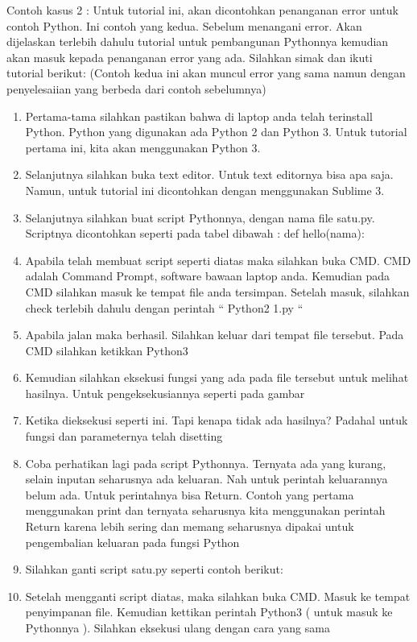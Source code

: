 Contoh kasus 2 : Untuk tutorial ini, akan dicontohkan penanganan error untuk contoh Python. Ini contoh yang kedua. Sebelum menangani error. Akan dijelaskan terlebih dahulu tutorial untuk pembangunan Pythonnya kemudian akan masuk kepada penanganan error yang ada. Silahkan simak dan ikuti tutorial berikut: 
(Contoh kedua ini akan muncul error yang sama namun dengan penyelesaiian yang berbeda dari contoh sebelumnya)
\begin{enumerate}
\item Pertama-tama silahkan pastikan bahwa di laptop anda telah terinstall Python. Python yang digunakan ada Python 2 dan Python 3. Untuk tutorial pertama ini, kita akan menggunakan Python 3.
\item Selanjutnya silahkan buka text editor. Untuk text editornya bisa apa saja. Namun, untuk tutorial ini dicontohkan dengan menggunakan Sublime 3.
\item Selanjutnya silahkan buat script Pythonnya, dengan nama file satu.py. Scriptnya dicontohkan seperti pada tabel dibawah :
def hello(nama):
\item Apabila telah membuat script seperti diatas maka silahkan buka CMD. CMD adalah Command Prompt, software bawaan laptop anda. Kemudian pada CMD silahkan masuk ke tempat file anda tersimpan. Setelah masuk, silahkan check terlebih dahulu dengan perintah “ Python2 1.py “
\item Apabila jalan maka berhasil. Silahkan keluar dari tempat file tersebut. Pada CMD silahkan ketikkan Python3
\item Kemudian silahkan eksekusi fungsi yang ada pada file tersebut untuk melihat hasilnya. Untuk pengeksekusiannya seperti pada gambar
\item Ketika dieksekusi seperti ini. Tapi kenapa tidak ada hasilnya? Padahal untuk fungsi dan parameternya telah disetting
\item Coba perhatikan lagi pada script Pythonnya. Ternyata ada yang kurang, selain inputan seharusnya ada keluaran. Nah untuk perintah keluarannya belum ada. Untuk perintahnya bisa Return. Contoh yang pertama menggunakan print dan ternyata seharusnya kita menggunakan perintah Return karena lebih sering dan memang seharusnya dipakai untuk pengembalian keluaran pada fungsi Python
\item Silahkan ganti script satu.py seperti contoh berikut:
\item Setelah mengganti script diatas, maka silahkan buka CMD. Masuk ke tempat penyimpanan file. Kemudian kettikan perintah Python3 ( untuk masuk ke Pythonnya ). Silahkan eksekusi ulang dengan cara yang sama

\end{enumerate}

